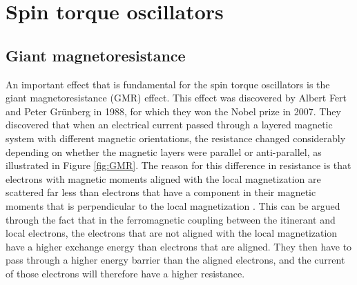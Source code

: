 \chapter{Spin torque oscillators}
\section{Giant magnetoresistance}
An important effect that is fundamental for the spin torque oscillators is the giant magnetoresistance (GMR) effect. This effect was discovered by Albert Fert \cite{Fert1988} and Peter Gr\"{u}nberg \cite{Grunberg1989} in 1988, for which they won the Nobel prize in 2007. They discovered that when an electrical current passed through a layered magnetic system with different magnetic orientations, the resistance changed considerably depending on whether the magnetic layers were parallel or anti-parallel, as illustrated in Figure \ref{fig:GMR}. The reason for this difference in resistance is that electrons with magnetic moments aligned with the local magnetization are scattered far less than electrons that have a component in their magnetic moments that is perpendicular to the local magnetization \cite{Chappert2007}. This can be argued through the fact that in the ferromagnetic coupling between the itinerant and local electrons, the electrons that are not aligned with the local magnetization have a higher exchange energy than electrons that are aligned. They then have to pass through a higher energy barrier than the aligned electrons, and the current of those electrons will therefore have a higher resistance.
